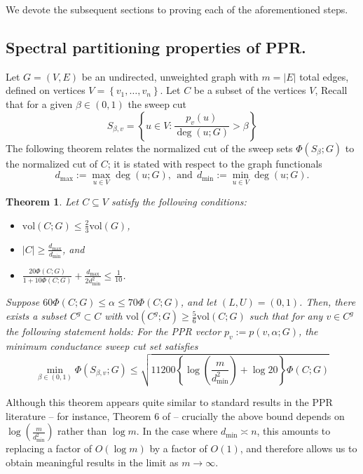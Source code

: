 \documentclass[11pt,twoside]{article}
\newtheorem{theorem}{Theorem}
\theoremstyle{definition}
\newcommand{\set}[1]{\left\{#1\right\}}
\newcommand{\vol}{\mathrm{vol}}
\newcommand{\abs}[1]{\left \lvert #1 \right \rvert}
\newcommand{\1}{\mathbbm{1}}
\begin{document}
We devote the subsequent sections to proving each of the aforementioned steps.

\subsection{Spectral partitioning properties of PPR.}

Let $G = (V,E)$ be an undirected, unweighted graph with $m = \abs{E}$ total edges, defined on vertices $V = \set{v_1, \ldots, v_n}$. Let $C$ be a subset of the vertices $V$, Recall that for a given $\beta \in (0,1)$ the sweep cut 
\begin{equation*}
S_{\beta,v} = \set{u \in V: \frac{p_v(u)}{\deg(u;G)} > \beta}
\end{equation*} 
The following theorem relates the normalized cut of the sweep sets $\Phi(S_{\beta};G)$ to the normalized cut of $C$; it is stated with respect to the graph functionals 
\begin{equation*}
d_{\max} := \max_{u \in V} \deg(u;G), ~~\textrm{and}~~ d_{\min} := \min_{u \in V} \deg(u;G).
\end{equation*}
\begin{theorem}
	\label{thm:conductance_ppr}
	Let $C \subseteq V$ satisfy the following conditions:
	\begin{itemize}
		\item $\vol(C;G) \leq \frac{2}{3}\vol(G)$,
		\item $\abs{C} \geq \frac{d_{\max}}{d_{\min}}$, and
		\item $\frac{20\Phi(C;G)}{1 + 10\Phi(C;G)} + \frac{d_{\max}}{2d_{\min}^2} \leq \frac{1}{10}$.
	\end{itemize}
	Suppose $60\Phi(C;G) \leq \alpha \leq 70\Phi(C;G)$, and let $(L,U) = (0,1)$. Then, there exists a subset $C^g \subset C$ with $\vol(C^g;G) \geq \frac{5}{6}\vol(C;G)$ such that for any $v \in C^g$ the following statement holds: For the PPR vector $p_v := p(v,\alpha;G)$, the minimum conductance sweep cut set satisfies 
	\begin{equation*}
	\min_{\beta \in (0,1)}\Phi(S_{\beta,v};G) \leq \sqrt{11200\left\{\log\left(\frac{m}{d_{\min}^2}\right) + \log 20\right\} \Phi(C;G)}
	\end{equation*}
\end{theorem}
Although this theorem appears quite similar to standard results in the PPR literature -- for instance, Theorem 6 of \citet{andersen2006} -- crucially the above bound depends on $\log\left(\frac{m}{d_{\min}^2}\right)$ rather than $\log m$. In the case where $d_{\min} \asymp n$, this amounts to replacing a factor of $O(\log m)$ by a factor of ${O}(1)$, and therefore allows us to obtain meaningful results in the limit as $m \to \infty$. 
\end{document}
